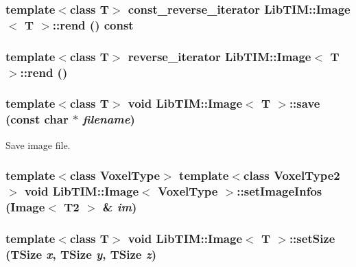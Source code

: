 \subsubsection{\setlength{\rightskip}{0pt plus 5cm}template$<$class T$>$ const\_\-reverse\_\-iterator {\bf Lib\-TIM::Image}$<$ T $>$::rend () const\hspace{0.3cm}{\tt  [inline, inherited]}}\label{group__Image_ga40}


\subsubsection{\setlength{\rightskip}{0pt plus 5cm}template$<$class T$>$ reverse\_\-iterator {\bf Lib\-TIM::Image}$<$ T $>$::rend ()\hspace{0.3cm}{\tt  [inline, inherited]}}\label{group__Image_ga39}


\subsubsection{\setlength{\rightskip}{0pt plus 5cm}template$<$class T$>$ void {\bf Lib\-TIM::Image}$<$ T $>$::save (const char $\ast$ {\em filename})\hspace{0.3cm}{\tt  [inherited]}}\label{group__Image_ga10}


Save image file. 

\subsubsection{\setlength{\rightskip}{0pt plus 5cm}template$<$class Voxel\-Type$>$ template$<$class Voxel\-Type2$>$ void {\bf Lib\-TIM::Image}$<$ Voxel\-Type $>$::set\-Image\-Infos ({\bf Image}$<$ T2 $>$ \& {\em im})\hspace{0.3cm}{\tt  [inherited]}}\label{group__Image_ga55}


\subsubsection{\setlength{\rightskip}{0pt plus 5cm}template$<$class T$>$ void {\bf Lib\-TIM::Image}$<$ T $>$::set\-Size ({\bf TSize} {\em x}, {\bf TSize} {\em y}, {\bf TSize} {\em z})\hspace{0.3cm}{\tt  [inline, inherited]}}\label{group__Image_ga23}


